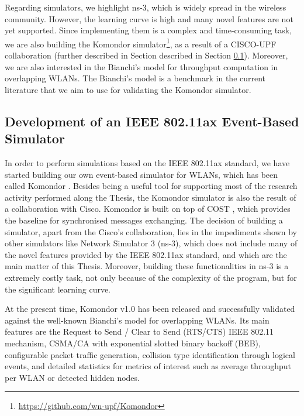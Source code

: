 \documentclass[12pt, a4paper,twoside]{tesi_upf}
\begin{document}
				Regarding simulators, we highlight ns-3, which is widely spread in the wireless community. However, the learning curve is high and many novel features are not yet supported. Since implementing them is a complex and time-consuming task, we are also building the Komondor simulator\footnote{\url{https://github.com/wn-upf/Komondor}}, as a result of a CISCO-UPF collaboration (further described in Section described in Section \ref{section:cisco_project}). Moreover, we are also interested in the Bianchi's model \cite{bianchi2000performance} for throughput computation in overlapping WLANs. The Bianchi's model is a benchmark in the current literature that we aim to use for validating the Komondor simulator.	

			\subsection{Development of an IEEE 802.11ax Event-Based Simulator}
			\label{section:cisco_project}	
				In order to perform simulations based on the IEEE 802.11ax standard, we have started building our own event-based simulator for WLANs, which has been called Komondor \cite{barrachina2017komondor}. Besides being a useful tool for supporting most of the research activity performed along the Thesis, the Komondor simulator is also the result of a collaboration with Cisco. Komondor is built on top of COST \cite{chen2005sense}, which provides the baseline for synchronised messages exchanging. The decision of building a simulator, apart from the Cisco's collaboration, lies in the impediments shown by other simulators like Network Simulator 3 (ns-3), which does not include many of the novel features provided by the IEEE 802.11ax standard, and which are the main matter of this Thesis. Moreover, building these functionalities in ns-3 is a extremely costly task, not only because of the complexity of the program, but for the significant learning curve.
				
				At the present time, Komondor v1.0 has been released and successfully validated against the well-known Bianchi's model for overlapping WLANs. Its main features are the Request to Send / Clear to Send (RTS/CTS) IEEE 802.11 mechanism, CSMA/CA with exponential slotted binary backoff (BEB), configurable packet traffic generation, collision type identification through logical events, and detailed statistics for metrics of interest such as average throughput per WLAN or detected hidden nodes. 			
				
\end{document}
